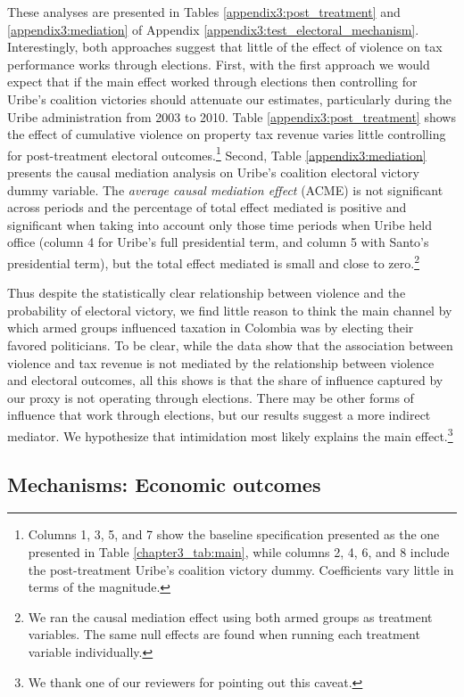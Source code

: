 These analyses are presented in Tables \ref{appendix3:post_treatment}
 and \ref{appendix3:mediation} of Appendix \ref{appendix3:test_electoral_mechanism}. Interestingly, both approaches suggest that little of the effect of violence on tax performance works through elections. First, with the first approach we would expect that if the main effect worked through elections then controlling for Uribe's coalition victories should attenuate our estimates, particularly during the Uribe administration from 2003 to 2010. Table \ref{appendix3:post_treatment} shows the effect of cumulative violence on property tax revenue varies little controlling for post-treatment electoral outcomes.\footnote{Columns 1, 3, 5, and 7 show the baseline specification presented as the one presented in Table \ref{chapter3_tab:main}, while columns 2, 4, 6, and 8 include the post-treatment Uribe's coalition victory dummy. Coefficients vary little in terms of the magnitude.} Second, Table \ref{appendix3:mediation} presents the causal mediation analysis on Uribe's coalition electoral victory dummy variable. The {\it average causal mediation effect} (ACME) is not significant across periods and the percentage of total effect mediated is positive and significant when taking into account only those time periods when Uribe held office (column 4 for Uribe's full presidential term, and column 5 with Santo's presidential term), but the total effect mediated is small and close to zero.\footnote{We ran the causal mediation effect using both armed groups as treatment variables. The same null effects are found when running each treatment variable individually.}  

Thus despite the statistically clear relationship between violence and the probability of electoral victory, we find little reason to think the main channel by which armed groups influenced taxation in Colombia was by electing their favored politicians. To be clear, while the data show that the association between violence and tax revenue is not mediated by the relationship between violence and electoral outcomes, all this shows is that the share of influence captured by our proxy is not operating through elections. There may be other forms of influence that work through elections, but our results suggest a more indirect mediator.  We hypothesize that intimidation most likely explains the main effect.\footnote{We thank one of our reviewers for pointing out this caveat.} 

\subsection{Mechanisms: Economic outcomes}

